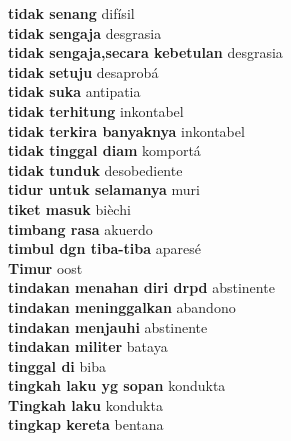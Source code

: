 \textbf{ tidak senang  } difísil \\
\textbf{ tidak sengaja  } desgrasia \\
\textbf{ tidak sengaja,secara kebetulan  } desgrasia \\
\textbf{ tidak setuju  } desaprobá \\
\textbf{ tidak suka  } antipatia \\
\textbf{ tidak terhitung  } inkontabel \\
\textbf{ tidak terkira banyaknya  } inkontabel \\
\textbf{ tidak tinggal diam  } komportá \\
\textbf{ tidak tunduk  } desobediente \\
\textbf{ tidur untuk selamanya  } muri \\
\textbf{ tiket masuk  } bièchi \\
\textbf{ timbang rasa  } akuerdo \\
\textbf{ timbul dgn tiba-tiba  } aparesé \\
\textbf{ Timur  } oost \\
\textbf{ tindakan menahan diri drpd  } abstinente \\
\textbf{ tindakan meninggalkan  } abandono \\
\textbf{ tindakan menjauhi  } abstinente \\
\textbf{ tindakan militer  } bataya \\
\textbf{ tinggal di  } biba \\
\textbf{ tingkah laku yg sopan  } kondukta \\
\textbf{ Tingkah laku  } kondukta \\
\textbf{ tingkap kereta  } bentana \\
